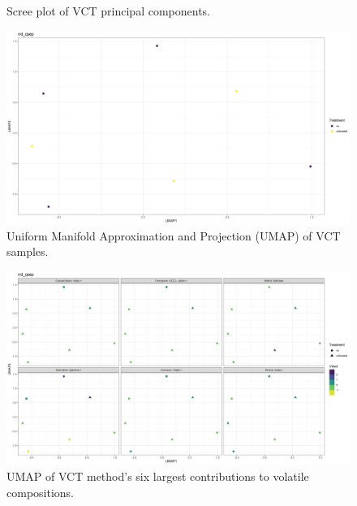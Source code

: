 \documentclass{ufdissertation}[overrideChapters] %
\begin{document}
{\begin{figure}
{}

\caption[Scree plot of VCT principal components]{Scree plot of VCT principal components.}\label{fig:qsep-vocs-scree}
\end{figure}
\begin{figure}

{\centering \includegraphics[width=1\linewidth]{figure/rrv_volatiles_umap_rrd_qsep} 

}

\caption[Uniform Manifold Approximation and Projection (UMAP) of VCT samples]{Uniform Manifold Approximation and Projection (UMAP) of VCT samples.}\label{fig:qsep-vocs-umap}
\end{figure}
\begin{figure}

{\centering \includegraphics[width=1\linewidth]{figure/rrv_volatiles_umap_chems_rrd_qsep} 

}

\caption[UMAP of VCT method's six largest contributions to volatile compositions]{UMAP of VCT method's six largest contributions to volatile compositions.}\label{fig:qsep-vocs-umap-chems}
\end{figure}
\begin{table}


\end{table}}
\end{document}
